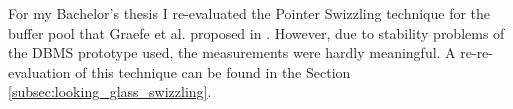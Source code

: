 \begin{myabstract}
    For my Bachelor's thesis I re-evaluated the Pointer Swizzling technique for the buffer pool that Graefe et al. proposed in \cite{Graefe:2014}. However, due to stability problems of the DBMS prototype used, the measurements were hardly meaningful. A re-re-evaluation of this technique can be found in the Section \ref{subsec:looking_glass_swizzling}.
    
\end{myabstract}
